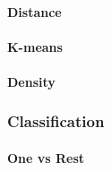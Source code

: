 \paragraph{Distance}

\paragraph{K-means}

\paragraph{Density}

\subsubsection{Classification}

\paragraph{One vs Rest}